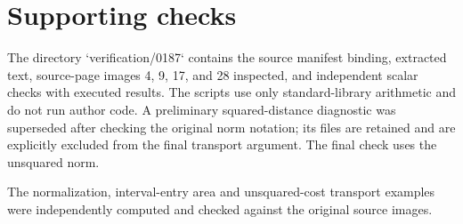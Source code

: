 \documentclass[10pt]{article}
\begin{document}
\section*{Supporting checks}
The directory `verification/0187` contains the source manifest binding, extracted text, source-page images 4, 9, 17, and 28 inspected, and independent scalar checks with executed results. The scripts use only standard-library arithmetic and do not run author code. A preliminary squared-distance diagnostic was superseded after checking the original norm notation; its files are retained and are explicitly excluded from the final transport argument. The final check uses the unsquared norm.\par
The normalization, interval-entry area and unsquared-cost transport examples were independently computed and checked against the original source images.\par
\end{document}
